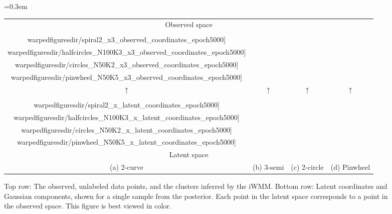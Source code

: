 %
\begin{figure*}%
\centering
{\tabcolsep=0.3em
\begin{tabular}{cccc}
\multicolumn{4}{c}{Observed space} \\
\fbox{\texttt{[image: \\warpedfiguresdir/spiral2\_x3\_observed\_coordinates\_epoch5000]}}
&
\fbox{\texttt{[image: \\warpedfiguresdir/halfcircles\_N100K3\_x3\_observed\_coordinates\_epoch5000]}}
&
\fbox{\texttt{[image: \\warpedfiguresdir/circles\_N50K2\_x3\_observed\_coordinates\_epoch5000]}}
&
\fbox{\texttt{[image: \\warpedfiguresdir/pinwheel\_N50K5\_x3\_observed\_coordinates\_epoch5000]}}\\
$\uparrow$ & $\uparrow$ & $\uparrow$ & $\uparrow$ \\ 
\fbox{\texttt{[image: \\warpedfiguresdir/spiral2\_x\_latent\_coordinates\_epoch5000]}}
&
\fbox{\texttt{[image: \\warpedfiguresdir/halfcircles\_N100K3\_x\_latent\_coordinates\_epoch5000]}}
&
\fbox{\texttt{[image: \\warpedfiguresdir/circles\_N50K2\_x\_latent\_coordinates\_epoch5000]}}
&
\fbox{\texttt{[image: \\warpedfiguresdir/pinwheel\_N50K5\_x\_latent\_coordinates\_epoch5000]}}
\\
\multicolumn{4}{c}{Latent space} \\
(a) 2-curve & (b) 3-semi & (c) 2-circle & (d) Pinwheel \\
\end{tabular}}
\caption[Recovering clusters on synthetic data]{
Top row: The observed, unlabeled data points, and the clusters inferred by the iWMM.
Bottom row: Latent coordinates and Gaussian components, shown for a single sample from the posterior.
Each point in the latent space corresponds to a point in the observed space. This figure is best viewed in color.}
\label{fig:warping}
\end{figure*}

